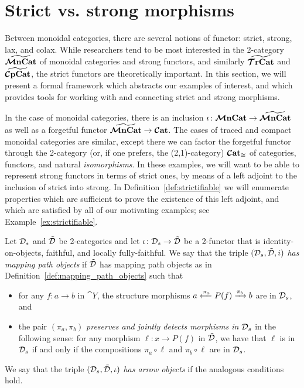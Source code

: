 \documentclass[11pt,oneside,article]{memoir}
\begin{document}
\section{Strict vs. strong morphisms}\label{sec:strict_vs_strong}

Between monoidal categories, there are several notions of functor: strict, strong, lax, and colax.
While researchers tend to be most interested in the 2-category $\widetilde{\bm{\mathcal{M}}\mathbf{nCat}}$ of monoidal categories and strong
functors, and similarly $\widetilde{\bm{\mathcal{T}}\mathbf{rCat}}$ and $\widetilde{\bm{\mathcal{C}}\mathbf{pCat}}$, the strict functors
are theoretically important. In this section, we will present a formal framework which abstracts our
examples of interest, and which provides tools for working with and connecting strict and strong morphisms.

In the case of monoidal categories, there is an inclusion $\iota\colon\bm{\mathcal{M}}\mathbf{nCat}\to\widetilde{\bm{\mathcal{M}}\mathbf{nCat}}$ as well as a
forgetful functor $\widetilde{\bm{\mathcal{M}}\mathbf{nCat}}\to\bm{\mathcal{C}}\mathbf{at}$. The cases of traced and compact monoidal categories are
similar, except there we can factor the forgetful functor through the 2-category (or, if one prefers, the (2,1)-category) $\bm{\mathcal{C}}\mathbf{at}_{\cong}$ of
categories, functors, and natural \emph{isomorphisms}. In these examples, we will want to be able to
represent strong functors in terms of strict ones, by means of a left adjoint to the inclusion of
strict into strong. In Definition~\ref{def:strictifiable} we will enumerate properties which are sufficient to prove the existence
of this left adjoint, and which are satisfied by all of our motivating examples; see Example~\ref{ex:strictifiable}.

\begin{definition}\label{def:preserve_jdetect_strictness}

 Let $\mathcal{D}_s$ and $\tilde{\mathcal{D}}$ be 2-categories and let $\iota\colon\mathcal{D}_s\to\tilde{\mathcal{D}}$ be a 2-functor that is identity-on-objects, faithful, and locally fully-faithful. We say that the triple $(\mathcal{D}_s,\tilde{\mathcal{D}},i)$ \emph{has mapping path objects} if $\tilde{\mathcal{D}}$ has mapping path objects as in Definition~\ref{def:mapping_path_objects} such that
 \begin{itemize}
 \item for any $f\colon a\to b$ in $\cat{Y}$, the structure morphisms $a\xleftarrow{\pi_a}P(f)\xrightarrow{\pi_b}b$ are in $\mathcal{D}_s$, and
 \item the pair $(\pi_a,\pi_b)$ \emph{preserves and jointly detects morphisms in $\mathcal{D}_s$} in the following sense: for any morphism $\ell\colon x\to P(f)$ in $\tilde{\mathcal{D}}$, we have that $\ell$ is in $\mathcal{D}_s$ if and only if the compositions $\pi_a\circ\ell$ and $\pi_b\circ\ell$ are in $\mathcal{D}_s$.
\end{itemize}
We say that the triple $(\mathcal{D}_s,\tilde{\mathcal{D}},\iota)$ \emph{has arrow objects} if the analogous conditions hold.
\end{definition}
\end{document}
